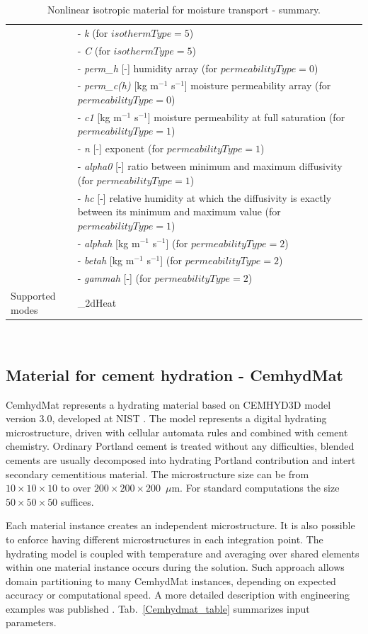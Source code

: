 \documentclass[a4paper]{article}
\newcommand{\param}[1]{{\it #1}}
\newenvironment{mmt}{\begin{tabular}{|l|p{9cm}|}}{\end{tabular}\\}
\newenvironment{mmt}{\begin{tabular}{|l|l|}}{\end{tabular}\\}
\begin{document}
\begin{table}[!htb]
\begin{mmt}
&- \param{k} (for $isothermType=5$) \\
&- \param{C} (for $isothermType=5$) \\
&- \param{perm\_h} [-] humidity array (for $permeabilityType=0$) \\
&- \param{perm\_c(h)} [kg m$^{-1}$ s$^{-1}$] moisture permeability
array (for $permeabilityType=0$) \\
&- \param{c1} [kg m$^{-1}$ s$^{-1}$] moisture permeability at full
saturation (for $permeabilityType=1$) \\
&- \param{n} [-] exponent (for $permeabilityType=1$) \\
&- \param{alpha0} [-] ratio between minimum and maximum diffusivity
(for $permeabilityType=1$) \\
&- \param{hc} [-] relative humidity at which the diffusivity is exactly
between its minimum and maximum value (for $permeabilityType=1$) \\
&- \param{alphah} [kg m$^{-1}$ s$^{-1}$] (for $permeabilityType=2$) \\
&- \param{betah} [kg m$^{-1}$ s$^{-1}$] (for $permeabilityType=2$) \\
&- \param{gammah} [-] (for $permeabilityType=2$) \\

Supported modes& \_2dHeat \\
\hline
\end{mmt}
\caption{Nonlinear isotropic material for moisture transport - summary.}
\label{NlIsoMoistureMat}
\end{table}



\subsection{Material for cement hydration - CemhydMat}
\label{Cemhyd}
CemhydMat represents a hydrating material based on CEMHYD3D model version 3.0,
developed at NIST \cite{NISTIR7232}. The model represents a digital hydrating
microstructure, driven with cellular automata rules and combined with cement
chemistry. Ordinary Portland cement is treated without any difficulties, blended
cements are usually decomposed into hydrating Portland contribution and intert
secondary cementitious material. The microstructure size can be from
$10\times10\times10$ to over $200\times200\times200$~$\mu$m. For standard
computations the size $50\times50\times50$ suffices.

Each material instance creates an independent microstructure. It is also
possible to enforce having different microstructures in each integration point.
The hydrating model is coupled with temperature and averaging over shared
elements within one material instance occurs during the solution. Such approach
allows domain partitioning to many CemhydMat instances, depending on expected
accuracy or computational speed. A more detailed description with engineering
examples was published \cite{Smilauer:09}. Tab.~\ref{Cemhydmat_table} summarizes input parameters.
\end{document}
